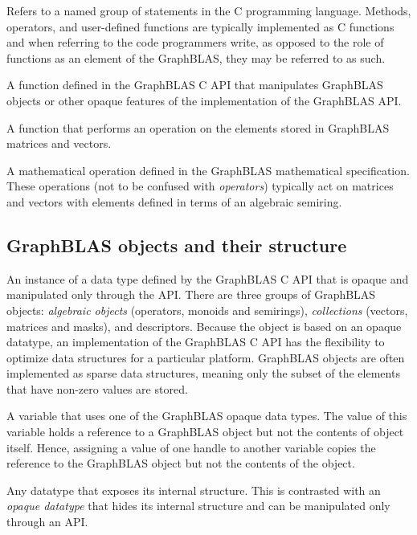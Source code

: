  Refers to a named group of statements in the C programming language.  Methods, operators,
and user-defined functions are typically implemented as C functions
 and when referring to 
the code programmers write, as opposed to the role of functions as an element of the GraphBLAS, they may
be referred to as such.

 A function defined in the GraphBLAS C API that manipulates
GraphBLAS objects or other opaque features of the implementation of the GraphBLAS API.

 A function that performs an operation on the elements stored in GraphBLAS matrices and vectors.

 A mathematical operation defined in the
GraphBLAS mathematical specification. These operations (not to be confused with \emph{operators}) typically act
on matrices and vectors with elements defined in terms of an algebraic semiring. 
\glossEnd

\subsection{GraphBLAS objects and their structure}

\glossBegin
{}  An instance of a data type defined by the GraphBLAS C
API that is opaque and manipulated only through the API. There are three groups of 
GraphBLAS objects: \emph{algebraic objects} (operators, monoids and semirings), 
\emph{collections} (vectors, matrices and masks), and descriptors.   Because the object
is based on an opaque datatype, an implementation of the GraphBLAS C API has the
flexibility to optimize data structures for a particular platform.  GraphBLAS objects
are often implemented as sparse data structures, meaning only the subset of the
elements that have non-zero values are stored.

  A variable that uses one of the GraphBLAS opaque data types.
The value of this variable holds a reference to a GraphBLAS object but not the contents of object itself.  
Hence, assigning a value of one handle to another variable copies the reference to the GraphBLAS object
but not the contents of the object.

 Any datatype that exposes its internal structure.   
This is contrasted
with an \emph{opaque datatype} that hides its internal structure and can
be manipulated only through an API.

